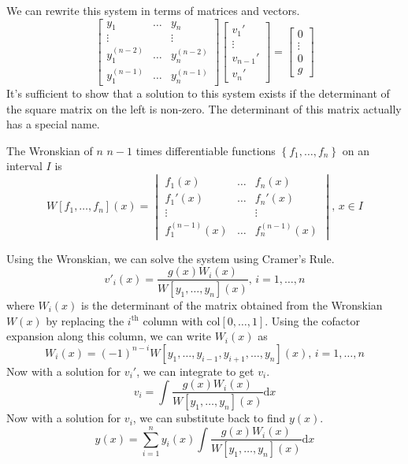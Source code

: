 \noindent
We can rewrite this system in terms of matrices and vectors.
\begin{equation*}
	\begin{bmatrix}
		y_1 & \ldots & y_n \\
		\vdots & & \vdots\\
		y_1^{(n-2)} & \ldots & y_n^{(n-2)} \\
		y_1^{(n-1)} & \ldots & y_n^{(n-1)}
	\end{bmatrix} \begin{bmatrix}
		v_1' \\
		\vdots \\
		v_{n-1}' \\
		v_n'
	\end{bmatrix} = \begin{bmatrix}
		0 \\
		\vdots \\
		0 \\
		g
	\end{bmatrix}
\end{equation*}
It's sufficient to show that a solution to this system exists if the determinant of the square matrix on the left is non-zero. The determinant of this matrix actually has a special name.

\begin{definition}
	The Wronskian of $n$ $n-1$ times differentiable functions $\left\{f_1, \ldots, f_n\right\}$ on an interval $I$ is
	\begin{equation*}
		W[f_1, \ldots, f_n](x) = \begin{vmatrix}
			f_1(x) & \ldots & f_n(x) \\
			f_1'(x) & \ldots & f_n'(x) \\
			\vdots &        & \vdots \\
			f_1^{(n-1)}(x) & \ldots & f_n^{(n-1)}(x)
		\end{vmatrix} \text{, } x \in I
	\end{equation*}
\end{definition} 

\noindent
Using the Wronskian, we can solve the system using Cramer's Rule.
\begin{equation*}
	v'_i(x) = \frac{g(x)W_i(x)}{W[y_1, \ldots, y_n](x)} \text{, } i = 1, \ldots, n
\end{equation*}
where $W_i(x)$ is the determinant of the matrix obtained from the Wronskian $W(x)$ by replacing the $i^{\text{th}}$ column with $\text{col}[0, \ldots, 1]$. Using the cofactor expansion along this column, we can write $W_i(x)$ as
\begin{equation*}
	W_i(x) = (-1)^{n-i}W[y_1, \ldots, y_{i-1}, y_{i+1}, \ldots, y_n](x) \text{, } i = 1, \ldots, n
\end{equation*}
Now with a solution for $v_i'$, we can integrate to get $v_i$.
\begin{equation*}
	v_i = \int{\frac{g(x)W_i(x)}{W[y_1, \ldots, y_n](x)} \mathrm{d}x}
\end{equation*}
Now with a solution for $v_i$, we can substitute back to find $y(x)$.
\begin{equation*}
	y(x) = \sum_{i=1}^{n}{y_i(x)\int{\frac{g(x)W_i(x)}{W[y_1, \ldots, y_n](x)} \mathrm{d}x}}
\end{equation*}

\ifodd{}\fi